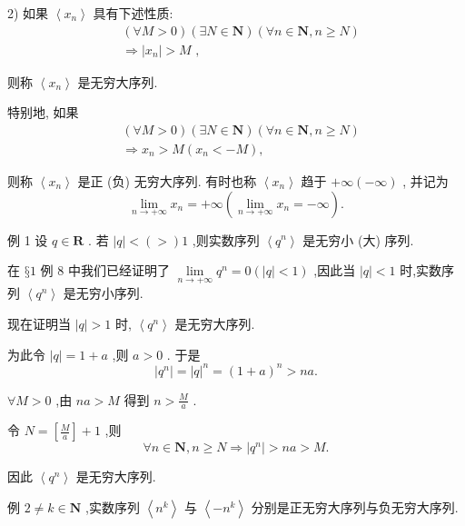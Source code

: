 2) 如果 $\left\langle  {x}_{n}\right\rangle$ 具有下述性质:
\begin{align*}
	&\left( {\forall M > 0}\right) \left( {\exists N \in  \mathbf{N}}\right) \left( {\forall n \in  \mathbf{N},n \geq  N}\right)\\
	&\Rightarrow  \left| {x}_{n}\right|  > M\text{ , }
\end{align*}

则称 $\left\langle  {x}_{n}\right\rangle$ 是无穷大序列.

特别地, 如果
\begin{align*}
	&\left( {\forall M > 0}\right) \left( {\exists N \in  \mathbf{N}}\right) \left( {\forall n \in  \mathbf{N},n \geq  N}\right)\\
	&\Rightarrow  {x}_{n} > M\left( {{x}_{n} <  - M}\right) ,
\end{align*}

则称 $\left\langle  {x}_{n}\right\rangle$ 是正 (负) 无穷大序列. 有时也称 $\left\langle  {x}_{n}\right\rangle$ 趋于 $+ \infty \left( {-\infty }\right)$ , 并记为
$$\mathop{\lim }\limits_{{n \rightarrow   + \infty }}{x}_{n} =  + \infty \left( {\mathop{\lim }\limits_{{n \rightarrow   + \infty }}{x}_{n} =  - \infty }\right) .$$

例 1 设 $q \in  \mathbf{R}$ . 若 $\left| q\right|  < \left(  > \right) 1$ ,则实数序列 $\left\langle  {q}^{n}\right\rangle$ 是无穷小 (大) 序列.

在 $§1$ 例 8 中我们已经证明了 $\mathop{\lim }\limits_{{n \rightarrow   + \infty }}{q}^{n} = 0\left( {\left| q\right|  < 1}\right)$ ,因此当 $\left| q\right|  < 1$ 时,实数序列 $\left\langle  {q}^{n}\right\rangle$ 是无穷小序列.

现在证明当 $\left| q\right|  > 1$ 时, $\left\langle  {q}^{n}\right\rangle$ 是无穷大序列.

为此令 $\left| q\right|  = 1 + a$ ,则 $a > 0$ . 于是
$$\left| {q}^{n}\right|  = {\left| q\right| }^{n} = {\left( 1 + a\right) }^{n} > {na}.$$

$\forall M > 0$ ,由 ${na} > M$ 得到 $n > \frac{M}{a}$ .

令 $N = \left\lbrack  \frac{M}{a}\right\rbrack   + 1$ ,则
$$\forall n \in  \mathbf{N},n \geq  N \Rightarrow  \left| {q}^{n}\right|  > {na} > M.$$

因此 $\left\langle  {q}^{n}\right\rangle$ 是无穷大序列.

例 $2 \neq  k \in  \mathbf{N}$ ,实数序列 $\left\langle  {n}^{k}\right\rangle$ 与 $\left\langle  {-{n}^{k}}\right\rangle$ 分别是正无穷大序列与负无穷大序列.

